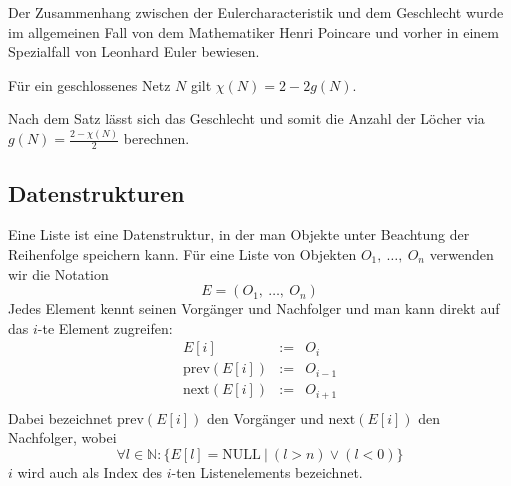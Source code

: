 Der Zusammenhang zwischen der Eulercharacteristik und dem Geschlecht wurde im allgemeinen Fall von dem Mathematiker  
Henri Poincare und vorher in einem Spezialfall von Leonhard Euler bewiesen. 
\begin{Satz}
Für ein geschlossenes Netz $N$ gilt $\chi(N) = 2 - 2g(N)$. 
\end{Satz}

\begin{Bemerkung}
Nach dem Satz lässt sich das Geschlecht und somit die Anzahl der Löcher via $g(N) = \frac{2- \chi(N)}{2}$ berechnen.
\end{Bemerkung}

\subsection{Datenstrukturen}
\begin{Definition}
Eine Liste ist eine Datenstruktur, in der man Objekte unter Beachtung der 
Reihenfolge speichern kann. 
Für eine Liste von Objekten $O_1,~\hdots,~O_n$ verwenden wir die Notation 
\begin{equation*}
    E = (O_1,~\hdots,~O_n )
\end{equation*}
Jedes Element kennt seinen Vorgänger und Nachfolger und man kann direkt 
auf das $i$-te Element zugreifen:
\begin{equation*}
    \begin{matrix}
        E[i] & := & O_i \\
        \textrm{prev}(E[i]) & := & O_{i-1} \\
        \textrm{next}(E[i]) & := & O_{i+1} \\
    \end{matrix}
\end{equation*}
Dabei bezeichnet $\textrm{prev}(E[i])$ den Vorgänger und $\textrm{next}(E[i])$ 
den Nachfolger, wobei 
\begin{equation*}
    \forall l \in \mathbb{N} : \{E[l] = \textrm{NULL}~|~(l>n) \vee (l<0)\}
\end{equation*}
$i$ wird auch als Index des $i$-ten Listenelements bezeichnet. 
\end{Definition}

